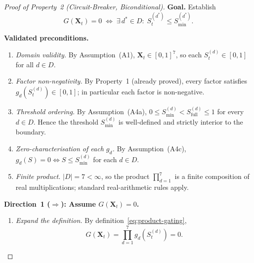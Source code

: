 \documentclass[12pt,openany]{book}
\numberwithin{equation}{chapter}
\theoremstyle{plain}
\theoremstyle{definition}
\theoremstyle{remark}
\def\mathcal#1{#1}%
\begin{document}
\begin{proof}[Proof of Property~2 (Circuit-Breaker, Biconditional)]
\textbf{Goal.}  Establish
\begin{equation}
  G(\mathbf{X}_t) = 0
  \;\Longleftrightarrow\;
  \exists\, d^* \in \mathcal{D}:\;
  \mathcal{S}_t^{(d^*)} \leq \mathcal{S}_{\min}^{(d^*)}.
  \label{eq:P2-goal}
\end{equation}

\medskip\noindent
\textbf{Validated preconditions.}
\begin{enumerate}
  \item \emph{Domain validity.}  By Assumption~(A1),
        $\mathbf{X}_t \in [0,1]^7$, so each
        $\mathcal{S}_t^{(d)} \in [0,1]$ for all $d\in\mathcal{D}$.
  \item \emph{Factor non-negativity.}  By Property~1
        (already proved), every factor satisfies
        $g_d\!\left(\mathcal{S}_t^{(d)}\right) \in [0,1]$;
        in particular each factor is non-negative.
  \item \emph{Threshold ordering.}  By Assumption~(A4a),
        $0 \leq \mathcal{S}_{\min}^{(d)}
         < \mathcal{S}_{\mathrm{full}}^{(d)} \leq 1$
        for every $d\in\mathcal{D}$.  Hence the threshold
        $\mathcal{S}_{\min}^{(d)}$ is well-defined and
        strictly interior to the boundary.
  \item \emph{Zero-characterisation of each $g_d$.}
        By Assumption~(A4c),
        $g_d(\mathcal{S}) = 0 \Leftrightarrow
         \mathcal{S} \leq \mathcal{S}_{\min}^{(d)}$
        for each $d\in\mathcal{D}$.
  \item \emph{Finite product.}  $|\mathcal{D}| = 7 < \infty$,
        so the product $\prod_{d=1}^{7}$ is a finite
        composition of real multiplications; standard
        real-arithmetic rules apply.
\end{enumerate}

\medskip
\noindent
\textbf{Direction~1 ($\Rightarrow$): Assume $G(\mathbf{X}_t)=0$.}
\begin{enumerate}
  \item \emph{Expand the definition.}
        By definition~\eqref{eq:product-gating},
        \begin{equation}
          G(\mathbf{X}_t)
          = \prod_{d=1}^{7}
              g_d\!\left(\mathcal{S}_t^{(d)}\right) = 0.
          \label{eq:P2-fwd-expand}
        \end{equation}


\end{enumerate}
\end{proof}
\end{document}
